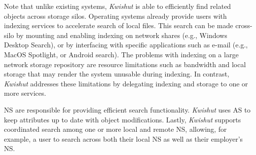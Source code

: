 
Note that unlike existing systems, \emph{Kwishut} is able to efficiently find related
objects across storage silos. Operating systems already provide users with
indexing services to accelerate search of local files. This search can be made
cross-silo by mounting and enabling indexing on network shares (e.g., Windows
Desktop Search), or by interfacing with specific applications such as e-mail
(e.g., MacOS Spotlight, or Android search). The problems with indexing on a
large network storage repository are resource limitations such as bandwidth and
local storage that may render the system unusable during indexing. In contrast,
\emph{Kwishut} addresses these limitations by delegating indexing and storage to one or
more services.

NS are responsible for providing efficient search functionality. \emph{Kwishut} uses AS
to keep attributes up to date with object modifications. Lastly, \emph{Kwishut}
supports coordinated search among one or more local and remote NS, allowing, for
example, a user to search across both their local NS as well as their employer's
NS.





